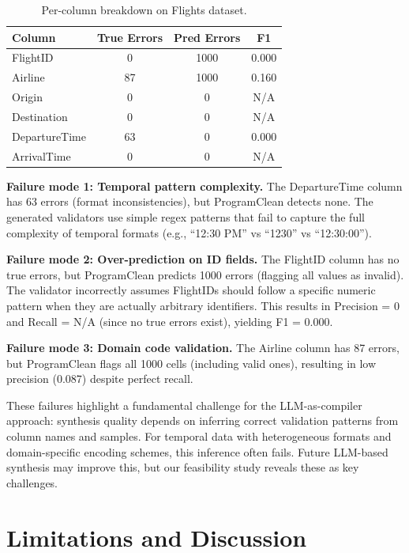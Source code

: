 \documentclass{article}
\begin{document}
\begin{table}[h]
\caption{Per-column breakdown on Flights dataset.}
\label{tab:flights_breakdown}
\centering
\small
\begin{tabular}{lccc}
\toprule
Column & True Errors & Pred Errors & F1 \\
\midrule
FlightID & 0 & 1000 & 0.000 \\
Airline & 87 & 1000 & 0.160 \\
Origin & 0 & 0 & N/A \\
Destination & 0 & 0 & N/A \\
DepartureTime & 63 & 0 & 0.000 \\
ArrivalTime & 0 & 0 & N/A \\
\bottomrule
\end{tabular}
\end{table}

\textbf{Failure mode 1: Temporal pattern complexity.} The DepartureTime column has 63 errors (format inconsistencies), but ProgramClean detects none. The generated validators use simple regex patterns that fail to capture the full complexity of temporal formats (e.g., ``12:30 PM'' vs ``1230'' vs ``12:30:00'').

\textbf{Failure mode 2: Over-prediction on ID fields.} The FlightID column has no true errors, but ProgramClean predicts 1000 errors (flagging all values as invalid). The validator incorrectly assumes FlightIDs should follow a specific numeric pattern when they are actually arbitrary identifiers. This results in Precision = 0 and Recall = N/A (since no true errors exist), yielding F1 = 0.000.

\textbf{Failure mode 3: Domain code validation.} The Airline column has 87 errors, but ProgramClean flags all 1000 cells (including valid ones), resulting in low precision (0.087) despite perfect recall.

These failures highlight a fundamental challenge for the LLM-as-compiler approach: synthesis quality depends on inferring correct validation patterns from column names and samples. For temporal data with heterogeneous formats and domain-specific encoding schemes, this inference often fails. Future LLM-based synthesis may improve this, but our feasibility study reveals these as key challenges.

\section{Limitations and Discussion}
\label{sec:limitations}
\end{document}
